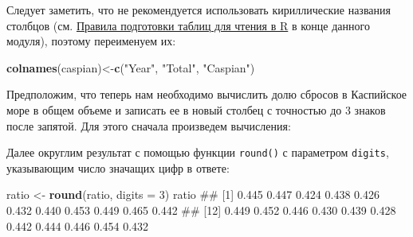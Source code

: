 \documentclass[]{book}
\newenvironment{Shaded}{\begin{snugshade}}{\end{snugshade}}
\newcommand{\KeywordTok}[1]{\textcolor[rgb]{0.13,0.29,0.53}{\textbf{#1}}}
\newcommand{\DataTypeTok}[1]{\textcolor[rgb]{0.13,0.29,0.53}{#1}}
\newcommand{\DecValTok}[1]{\textcolor[rgb]{0.00,0.00,0.81}{#1}}
\newcommand{\StringTok}[1]{\textcolor[rgb]{0.31,0.60,0.02}{#1}}
\newcommand{\OperatorTok}[1]{\textcolor[rgb]{0.81,0.36,0.00}{\textbf{#1}}}
\newcommand{\NormalTok}[1]{#1}
\begin{document}
\begin{Shaded}
\end{Shaded}

Следует заметить, что не рекомендуется использовать кириллические
названия столбцов (см. \protect\hyperlink{table_rules}{Правила
подготовки таблиц для чтения в R} в конце данного модуля), поэтому
переименуем их:

\begin{Shaded}
\begin{Highlighting}[]
\KeywordTok{colnames}\NormalTok{(caspian)<-}\KeywordTok{c}\NormalTok{(}\StringTok{"Year"}\NormalTok{, }\StringTok{"Total"}\NormalTok{, }\StringTok{"Caspian"}\NormalTok{)}
\end{Highlighting}
\end{Shaded}

Предположим, что теперь нам необходимо вычислить долю сбросов в
Каспийское море в общем объеме и записать ее в новый столбец с точностью
до 3 знаков после запятой. Для этого сначала произведем вычисления:

\begin{Shaded}
\end{Shaded}

Далее округлим результат с помощью функции \texttt{round()} с параметром
\texttt{digits}, указывающим число значащих цифр в ответе:

\begin{Shaded}
\begin{Highlighting}[]
\NormalTok{ratio <-}\StringTok{ }\KeywordTok{round}\NormalTok{(ratio, }\DataTypeTok{digits =} \DecValTok{3}\NormalTok{)}
\NormalTok{ratio}
\NormalTok{##  [1] 0.445 0.447 0.424 0.438 0.426 0.432 0.440 0.453 0.449 0.465 0.442}
\NormalTok{## [12] 0.449 0.452 0.446 0.430 0.439 0.428 0.442 0.444 0.446 0.454 0.432}
\end{Highlighting}
\end{Shaded}
\end{document}
